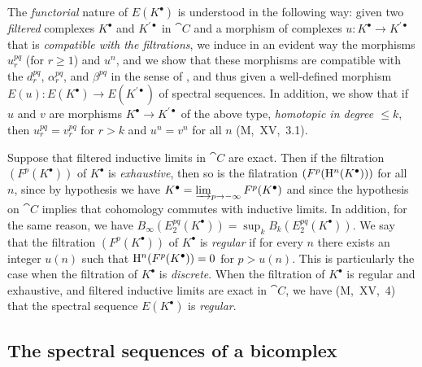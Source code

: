 
\begin{env}[11.2.3]
\label{0.11.2.3}
The \emph{functorial} nature of $E(K^\bullet)$ is understood in the following way: given two \emph{filtered} complexes $K^\bullet$ and $K^{\prime\bullet}$ in $\cat{C}$ and a morphism of complexes $u:K^\bullet\to K^{\prime\bullet}$ that is \emph{compatible with the filtrations}, we induce in an evident way the morphisms $u_r^{pq}$ (for $r\geq 1$) and $u^n$, and we show that these morphisms are compatible with the $d_r^{pq}$, $\alpha_r^{pq}$, and $\beta^{pq}$ in the sense of , and thus given a well-defined morphism $E(u):E(K^\bullet)\to E(K^{\prime\bullet})$ of spectral sequences.
In addition, we show that if $u$ and $v$ are morphisms $K^\bullet\to K^{\prime\bullet}$ of the above type, \emph{homotopic in degree $\leq k$}, then $u_r^{pq}=v_r^{pq}$ for $r>k$ and $u^n=v^n$ for all $n$ (M,~XV,~3.1).
\end{env}

\begin{env}[11.2.4]
\label{0.11.2.4}
Suppose that filtered inductive limits in $\cat{C}$ are exact.
Then if the filtration $(F^p(K^\bullet))$ of $K^\bullet$ is \emph{exhaustive}, then so is the filatration $(F^p(\mathrm{H}^n(K^\bullet)))$ for all $n$, since by hypothesis we have $K^\bullet=\varinjlim_{p\to-\infty}F^p(K^\bullet)$ and since the hypothesis on $\cat{C}$ implies that cohomology commutes with inductive limits.
In addition, for the same reason, we have $B_\infty(E_2^{pq}(K^\bullet))=\sup_k B_k(E_2^{pq}(K^\bullet))$.
We say that the filtration $(F^p(K^\bullet))$ of $K^\bullet$ is \emph{regular} if for every $n$ there exists an integer $u(n)$ such that $\mathrm{H}^n(F^p(K^\bullet))=0$ for $p>u(n)$.
This is particularly the case when the filtration of $K^\bullet$ is \emph{discrete}.
When the filtration of $K^\bullet$ is regular and exhaustive, and filtered inductive limits are exact in $\cat{C}$, we have (M,~XV,~4) that the spectral sequence $E(K^\bullet)$ is \emph{regular}.
\end{env}

\subsection{The spectral sequences of a bicomplex}
\label{subsection:0.11.3}

